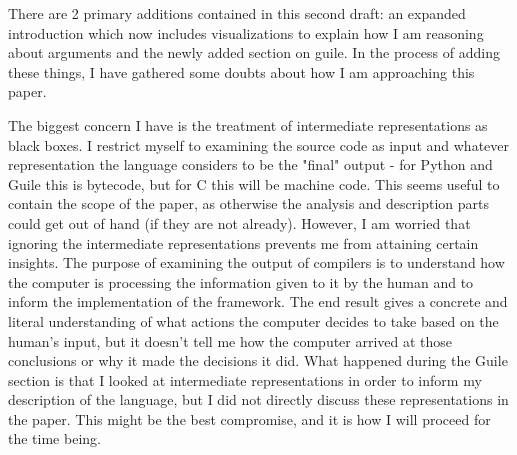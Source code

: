 There are 2 primary additions contained in this second draft: an expanded introduction
which now includes visualizations to explain how I am reasoning about arguments and the
newly added section on guile.
In the process of adding these things, I have gathered some doubts about how I am
approaching this paper.

The biggest concern I have is the treatment of intermediate representations as black
boxes.
I restrict myself to examining the source code as input and whatever representation the
language considers to be the "final" output - for Python and Guile this is bytecode, but
for C this will be machine code.
This seems useful to contain the scope of the paper, as otherwise the analysis and
description parts could get out of hand (if they are not already).
However, I am worried that ignoring the intermediate representations prevents me from
attaining certain insights.
The purpose of examining the output of compilers is to understand how the computer is
processing the information given to it by the human and to inform the implementation of
the framework.
The end result gives a concrete and literal understanding of what actions the computer
decides to take based on the human's input, but it doesn't tell me how the computer
arrived at those conclusions or why it made the decisions it did.
What happened during the Guile section is that I looked at intermediate representations
in order to inform my description of the language, but I did not directly discuss these
representations in the paper.
This might be the best compromise, and it is how I will proceed for the time being.

